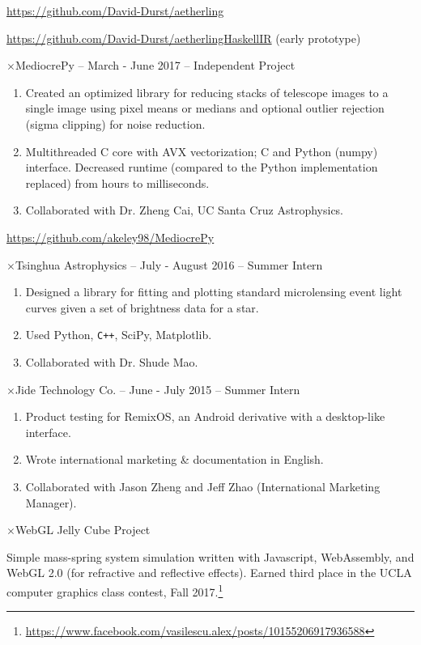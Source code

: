 \documentclass[11pt]{article}
\newcommand{\web}[1]{{ \color{webColor} \small \url{#1}}}
\newcommand{\myTitle}[1]{\vspace{2mm}{ \LARGE \color{titleColor} \textsf{#1}\vspace{2mm}}}
\newcommand{\mySub}[1]{{\color{subColor}$\times$\hspace{1mm}\textsf{#1}}}
\begin{document}
\web{https://github.com/David-Durst/aetherling}

\web{https://github.com/David-Durst/aetherlingHaskellIR} (early prototype)

\mySub{MediocrePy -- March - June 2017 -- Independent Project}
\begin{enumerate}
\item Created an optimized library for reducing stacks of telescope
  images to a single image using pixel means or medians and optional
  outlier rejection (sigma clipping) for noise reduction.
\item Multithreaded C core with AVX vectorization; C and Python
  (numpy) interface. Decreased runtime (compared to the Python
  implementation replaced) from hours to milliseconds.
\item Collaborated with Dr. Zheng Cai, UC Santa Cruz Astrophysics.
\end{enumerate}
\web{https://github.com/akeley98/MediocrePy}

\mySub{Tsinghua Astrophysics -- July - August 2016 -- Summer Intern}
\begin{enumerate}
\item Designed a library for fitting and plotting standard
  microlensing event light curves given a set of brightness
  data for a star.
\item Used Python, \texttt{C++}, SciPy, Matplotlib.
\item Collaborated with Dr. Shude Mao.
\end{enumerate}

\mySub{Jide Technology Co. -- June - July 2015 -- Summer Intern}
\begin{enumerate}
\item Product testing for RemixOS, an Android derivative with a
  desktop-like interface.

\item Wrote international marketing \& documentation in English.

\item Collaborated with Jason Zheng and Jeff Zhao (International
  Marketing Manager).
\end{enumerate}

\newpage
\myTitle{Other Projects}

\mySub{WebGL Jelly Cube Project}

Simple mass-spring system simulation written with Javascript,
WebAssembly, and WebGL 2.0 (for refractive and reflective effects).
Earned third place in the UCLA computer graphics class contest, Fall
2017.\footnote{
  \web{https://www.facebook.com/vasilescu.alex/posts/10155206917936588}}
\end{document}

